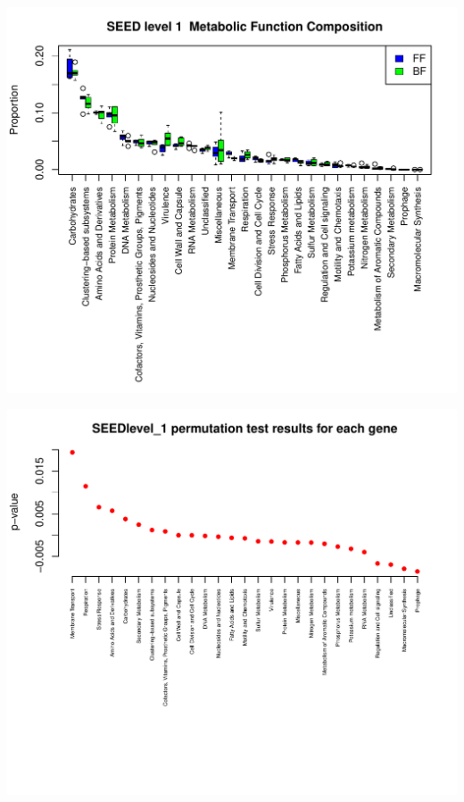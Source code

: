 \documentclass{article}\usepackage[]{graphicx}\usepackage[]{color}
\makeatletter
\def\maxwidth{ %
  \ifdim\Gin@nat@width>\linewidth
    \linewidth
  \else
    \Gin@nat@width
  \fi
}
\makeatother
\begin{document}
\begin{Schunk}


{\centering \includegraphics[width=\maxwidth]{figure/Oct_15_1-1} 

}



{\centering \includegraphics[width=\maxwidth]{figure/Oct_15_1-2} 

}




\end{Schunk}
\end{document}
